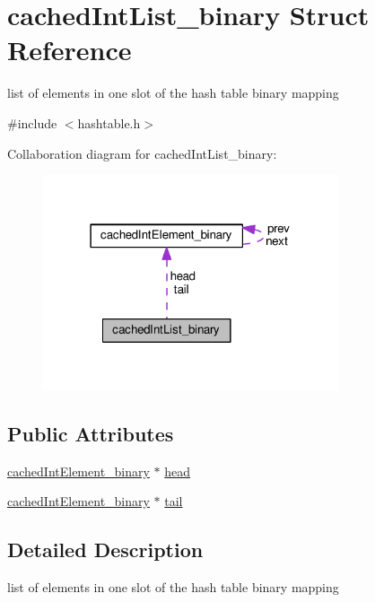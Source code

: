 \hypertarget{structcachedIntList__binary}{}\section{cached\+Int\+List\+\_\+binary Struct Reference}
\label{structcachedIntList__binary}


list of elements in one slot of the hash table binary mapping  




{\ttfamily \#include $<$hashtable.\+h$>$}



Collaboration diagram for cached\+Int\+List\+\_\+binary\+:\nopagebreak
\begin{figure}[H]
\begin{center}
\leavevmode
\includegraphics[width=247pt]{structcachedIntList__binary__coll__graph}
\end{center}
\end{figure}
\subsection*{Public Attributes}
\begin{DoxyCompactItemize}
\item 
\hyperlink{structcachedIntElement__binary}{cached\+Int\+Element\+\_\+binary} $\ast$ \hyperlink{structcachedIntList__binary_ab51ea19cb68af38612cad45b08d9239f}{head}
\item 
\hyperlink{structcachedIntElement__binary}{cached\+Int\+Element\+\_\+binary} $\ast$ \hyperlink{structcachedIntList__binary_ad92905f1242fc89c700572d0d510c17f}{tail}
\end{DoxyCompactItemize}


\subsection{Detailed Description}
list of elements in one slot of the hash table binary mapping 

